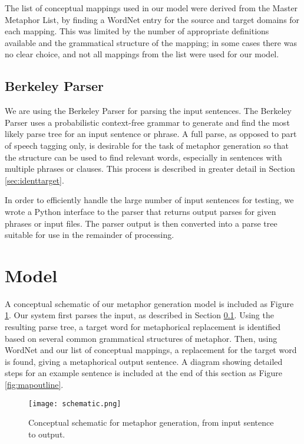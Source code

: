 \documentclass[12pt]{article}
\begin{document}
The list of conceptual mappings used in our model were derived from the Master Metaphor List, by finding a WordNet entry for the source and target domains for each mapping.  This was limited by the number of appropriate definitions available and the grammatical structure of the mapping; in some cases there was no clear choice, and not all mappings from the list were used for our model.

\subsection{Berkeley Parser}
\label{sec:berkeleyparser}

We are using the Berkeley Parser \cite{berkeleyparser} for parsing the input sentences.  The Berkeley Parser uses a probabilistic context-free grammar to generate and find the most likely parse tree for an input sentence or phrase.  A full parse, as opposed to part of speech tagging only, is desirable for the task of metaphor generation so that the structure can be used to find relevant words, especially in sentences with multiple phrases or clauses.  This process is described in greater detail in Section \ref{sec:identtarget}.

In order to efficiently handle the large number of input sentences for testing, we wrote a Python interface to the parser that returns output parses for given phrases or input files.  The parser output is then converted into a parse tree suitable for use in the remainder of processing.

\section{Model}

A conceptual schematic of our metaphor generation model is included as Figure \ref{fig:schematic}.  Our system first parses the input, as described in Section \ref{sec:berkeleyparser}.  Using the resulting parse tree, a target word for metaphorical replacement is identified based on several common grammatical structures of metaphor.  Then, using WordNet and our list of conceptual mappings, a replacement for the target word is found, giving a metaphorical output sentence.  A diagram showing detailed steps for an example sentence is included at the end of this section as Figure \ref{fig:mapoutline}.

\begin{figure}[h]
	\centering
	\texttt{[image: schematic.png]}
	\caption{Conceptual schematic for metaphor generation, from input sentence to output.}
	\label{fig:schematic}
\end{figure}
\end{document}

